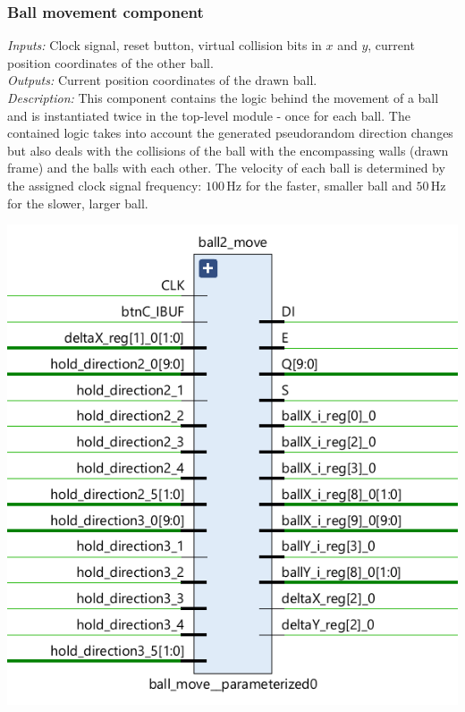 \documentclass[11pt,a4paper]{article}
\def\Hz{\,\mathrm{Hz}}
\begin{document}
        \subsubsection*{Ball movement component}
        \begin{minipage}{.45\textwidth}
            \emph{Inputs:} Clock signal, reset button, virtual collision bits in $x$ and $y$, current position coordinates of the other ball.\\[1em]
            \emph{Outputs:} Current position coordinates of the drawn ball.\\[1em]
            \emph{Description:} This component contains the logic behind the movement of a ball and is instantiated twice in the top-level module - once for each ball. The contained logic takes into account the generated pseudorandom direction changes but also deals with the collisions of the ball with the encompassing walls (drawn frame) and the balls with each other. The velocity of each ball is determined by the assigned clock signal frequency: $100\Hz$ for the faster, smaller ball and $50\Hz$ for the slower, larger ball.
        \end{minipage}
        \hfill
        \begin{minipage}{.45\textwidth}
            \includegraphics[width=\textwidth]{src/ball-move.png}
        \end{minipage}
\end{document}
